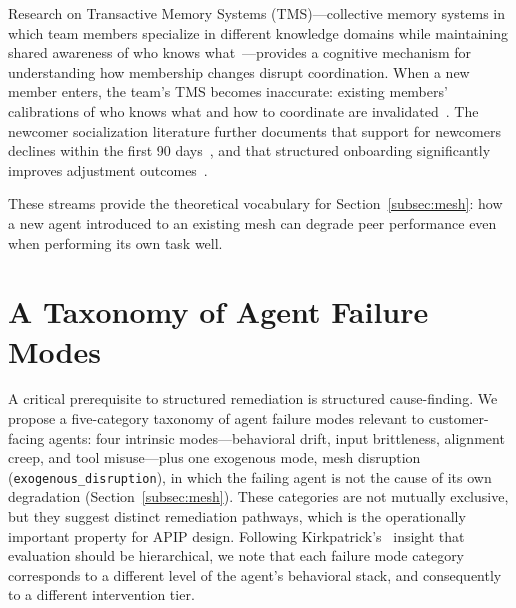 \documentclass[conference]{IEEEtran}
\begin{document}
Research on Transactive Memory Systems (TMS)---collective memory systems in
which team members specialize in different knowledge domains while maintaining
shared awareness of who knows
what~\cite{wegner1987transactive,lewis2007group,ren2011transactive,liang1995group,moreland2003transactive}---provides
a cognitive mechanism for understanding how membership changes disrupt
coordination. When a new member enters, the team's TMS becomes inaccurate:
existing members' calibrations of who knows what and how to coordinate are
invalidated~\cite{lewis2007group,wegner1987transactive}. The newcomer
socialization literature further documents that support for newcomers declines
within the first 90 days~\cite{kammeyer2013support}, and that structured
onboarding significantly improves adjustment outcomes~\cite{bauer2025newcomer}.

These streams provide the theoretical vocabulary for
Section~\ref{subsec:mesh}: how a new agent introduced to an existing mesh can
degrade peer performance even when performing its own task well.
\section{A Taxonomy of Agent Failure Modes}
\label{sec:taxonomy}

A critical prerequisite to structured remediation is structured cause-finding.
We propose a five-category taxonomy of agent failure modes relevant to
customer-facing agents: four intrinsic modes---behavioral drift, input
brittleness, alignment creep, and tool misuse---plus one exogenous mode,
mesh disruption (\texttt{exogenous\_disruption}), in which the failing agent is
not the cause of its own degradation
(Section~\ref{subsec:mesh}). These categories are not mutually exclusive, but they
suggest distinct remediation pathways, which is the operationally important
property for APIP design. Following Kirkpatrick's~\cite{kirkpatrick1994evaluating}
insight that evaluation should be hierarchical, we note that each failure mode
category corresponds to a different level of the agent's behavioral stack, and
consequently to a different intervention tier.
\end{document}
